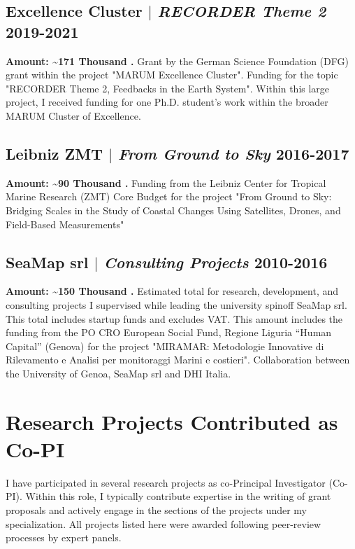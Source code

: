 \documentclass[11pt]{article}
\begin{document}
\subsection{Excellence Cluster $|$ {\normalfont\textit{RECORDER Theme 2}} \hfill 2019-2021}
{\footnotesize \textbf{Amount: \textasciitilde171 Thousand \texteuro.} Grant by the German Science Foundation (DFG) grant within the project "MARUM Excellence Cluster". Funding for the topic "RECORDER Theme 2, Feedbacks in the Earth System". Within this large project, I received funding for one Ph.D. student's work within the broader MARUM Cluster of Excellence.}
\bigskip

\subsection{Leibniz ZMT $|$ {\normalfont\textit{From Ground to Sky}} \hfill 2016-2017}
{\footnotesize \textbf{Amount: \textasciitilde90 Thousand \texteuro.} Funding from the Leibniz Center for Tropical Marine Research (ZMT) Core Budget for the project "From Ground to Sky: Bridging Scales in the Study of Coastal Changes Using Satellites, Drones, and Field-Based Measurements"}
\bigskip

\subsection{SeaMap srl $|$ {\normalfont\textit{Consulting Projects}} \hfill 2010-2016}
{\footnotesize \textbf{Amount: \textasciitilde150 Thousand \texteuro.} Estimated total for research, development, and consulting projects I supervised while leading the university spinoff SeaMap srl. This total includes startup funds and excludes VAT. This amount includes the funding from the PO CRO European Social Fund, Regione Liguria “Human Capital” (Genova) for the project "MIRAMAR: Metodologie Innovative di Rilevamento e Analisi per monitoraggi Marini e costieri". Collaboration between the University of Genoa, SeaMap srl and DHI Italia.}
\bigskip

\newpage
\section{Research Projects Contributed as Co-PI}
{\normalfont I have participated in several research projects as co-Principal Investigator (Co-PI). Within this role, I typically contribute expertise in the writing of grant proposals and actively engage in the sections of the projects under my specialization. All projects listed here were awarded following peer-review processes by expert panels.}\\
\end{document}
